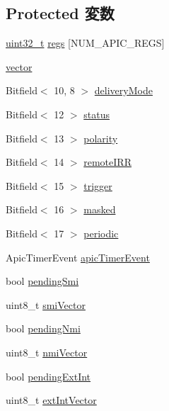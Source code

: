 \subsection*{Protected 変数}
\begin{DoxyCompactItemize}
\item 
\hyperlink{Type_8hh_a435d1572bf3f880d55459d9805097f62}{uint32\_\-t} \hyperlink{classX86ISA_1_1Interrupts_a707ddf628cd5b3ebd09a9721fbc2d9ee}{regs} \mbox{[}NUM\_\-APIC\_\-REGS\mbox{]}
\item 
\hyperlink{classX86ISA_1_1Interrupts_a7ea82552101f041fad7635b3ed036a84}{vector}
\item 
Bitfield$<$ 10, 8 $>$ \hyperlink{classX86ISA_1_1Interrupts_aa6bdaa7818eb499f0dcf848f4ae7d569}{deliveryMode}
\item 
Bitfield$<$ 12 $>$ \hyperlink{classX86ISA_1_1Interrupts_a7d1baf1ae14e4e146b6809c41c82bde5}{status}
\item 
Bitfield$<$ 13 $>$ \hyperlink{classX86ISA_1_1Interrupts_ae3c9a79ca2272b1906da22919f226af3}{polarity}
\item 
Bitfield$<$ 14 $>$ \hyperlink{classX86ISA_1_1Interrupts_ae074e6e7f5c02b863d4ffe1040e7e7a0}{remoteIRR}
\item 
Bitfield$<$ 15 $>$ \hyperlink{classX86ISA_1_1Interrupts_a1a8acf21e383afeb477a3d8e88b689de}{trigger}
\item 
Bitfield$<$ 16 $>$ \hyperlink{classX86ISA_1_1Interrupts_ac68c9e75c6befae7812cc44b8426a97e}{masked}
\item 
Bitfield$<$ 17 $>$ \hyperlink{classX86ISA_1_1Interrupts_a333fdd71ed0dd6e53569e894f9367ffb}{periodic}
\item 
ApicTimerEvent \hyperlink{classX86ISA_1_1Interrupts_a21b9dbd6985d9ae8c9f83cfccafd7d29}{apicTimerEvent}
\item 
bool \hyperlink{classX86ISA_1_1Interrupts_aeeb4c03ee1caa86828b12a7085f845c9}{pendingSmi}
\item 
uint8\_\-t \hyperlink{classX86ISA_1_1Interrupts_ac62acbbee5adef17b6e0b960b7fb11c5}{smiVector}
\item 
bool \hyperlink{classX86ISA_1_1Interrupts_a1ecac2b1b786eb4f69035a6f1b499297}{pendingNmi}
\item 
uint8\_\-t \hyperlink{classX86ISA_1_1Interrupts_acc5de6934d3b5e99ddfa33038bedc24a}{nmiVector}
\item 
bool \hyperlink{classX86ISA_1_1Interrupts_abd62a9c6790d83c7ae435b181c831471}{pendingExtInt}
\item 
uint8\_\-t \hyperlink{classX86ISA_1_1Interrupts_a916ffa14869566ee27ff80a156e8dade}{extIntVector}

\end{DoxyCompactItemize}
